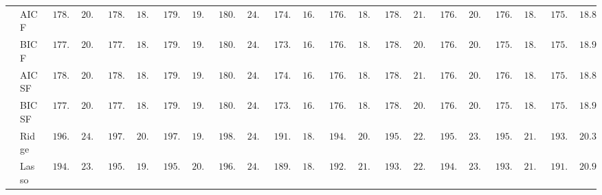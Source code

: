 \begin{tabular}{ll|ll|llllll|llllll|llllll}
 & AIC F  & $\phantom{0}178.14$ & $\phantom{0}20.33$ & $\phantom{0}178.14$ & $\phantom{0}18.34$ & $\phantom{0}179.45$ & $\phantom{0}19.77$ & $\phantom{0}180.28$ & $\phantom{0}24.28$ & $\phantom{0}174.29$ & $\phantom{0}16.46$ & $\phantom{0}176.02$ & $\phantom{0}18.09$ & $\phantom{0}178.19$ & $\phantom{0}21.00$ & $\phantom{0}176.90$ & $\phantom{0}20.13$ & $\phantom{0}176.21$ & $\phantom{0}18.51$ & $\phantom{0}175.89$ & $\phantom{0}18.87$ \\
 & BIC F  & $\phantom{0}177.68$ & $\phantom{0}20.18$ & $\phantom{0}177.96$ & $\phantom{0}18.41$ & $\phantom{0}179.27$ & $\phantom{0}19.62$ & $\phantom{0}180.30$ & $\phantom{0}24.16$ & $\phantom{0}173.97$ & $\phantom{0}16.23$ & $\phantom{0}176.04$ & $\phantom{0}18.17$ & $\phantom{0}178.14$ & $\phantom{0}20.94$ & $\phantom{0}176.58$ & $\phantom{0}20.13$ & $\phantom{0}175.80$ & $\phantom{0}18.66$ & $\phantom{0}175.86$ & $\phantom{0}18.92$ \\
 & AIC SF  & $\phantom{0}178.14$ & $\phantom{0}20.33$ & $\phantom{0}178.14$ & $\phantom{0}18.34$ & $\phantom{0}179.45$ & $\phantom{0}19.77$ & $\phantom{0}180.28$ & $\phantom{0}24.28$ & $\phantom{0}174.29$ & $\phantom{0}16.46$ & $\phantom{0}176.02$ & $\phantom{0}18.09$ & $\phantom{0}178.18$ & $\phantom{0}21.00$ & $\phantom{0}176.90$ & $\phantom{0}20.13$ & $\phantom{0}176.21$ & $\phantom{0}18.51$ & $\phantom{0}175.89$ & $\phantom{0}18.87$ \\
 & BIC SF  & $\phantom{0}177.68$ & $\phantom{0}20.18$ & $\phantom{0}177.96$ & $\phantom{0}18.41$ & $\phantom{0}179.27$ & $\phantom{0}19.62$ & $\phantom{0}180.30$ & $\phantom{0}24.16$ & $\phantom{0}173.97$ & $\phantom{0}16.23$ & $\phantom{0}176.04$ & $\phantom{0}18.17$ & $\phantom{0}178.14$ & $\phantom{0}20.94$ & $\phantom{0}176.58$ & $\phantom{0}20.13$ & $\phantom{0}175.80$ & $\phantom{0}18.66$ & $\phantom{0}175.86$ & $\phantom{0}18.92$ \\
 & Ridge  & $\phantom{0}196.16$ & $\phantom{0}24.13$ & $\phantom{0}197.32$ & $\phantom{0}20.38$ & $\phantom{0}197.50$ & $\phantom{0}19.88$ & $\phantom{0}198.32$ & $\phantom{0}24.32$ & $\phantom{0}191.23$ & $\phantom{0}18.79$ & $\phantom{0}194.59$ & $\phantom{0}20.98$ & $\phantom{0}195.82$ & $\phantom{0}22.71$ & $\phantom{0}195.70$ & $\phantom{0}23.53$ & $\phantom{0}195.42$ & $\phantom{0}21.44$ & $\phantom{0}193.11$ & $\phantom{0}20.32$ \\
 & Lasso  & $\phantom{0}194.60$ & $\phantom{0}23.36$ & $\phantom{0}195.30$ & $\phantom{0}19.67$ & $\phantom{0}195.66$ & $\phantom{0}20.49$ & $\phantom{0}196.07$ & $\phantom{0}24.79$ & $\phantom{0}189.92$ & $\phantom{0}18.94$ & $\phantom{0}192.95$ & $\phantom{0}21.34$ & $\phantom{0}193.37$ & $\phantom{0}22.98$ & $\phantom{0}194.33$ & $\phantom{0}23.24$ & $\phantom{0}193.45$ & $\phantom{0}21.14$ & $\phantom{0}191.25$ & $\phantom{0}20.97$ \\

\end{tabular}
